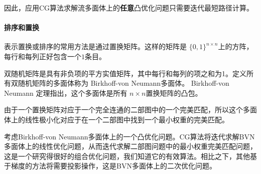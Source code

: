 因此，应用CG算法求解流多面体上的{\bf 任意}凸优化问题只需要迭代最短路径计算。


\paragraph*{
    排序和置换
    }

表示置换或排序的常用方法是通过置换矩阵。这样的矩阵是 $\{0,1\}^{n \times n}$上的方阵，每行和每列正好包含一个$1$条目。

双随机矩阵是具有非负项的平方实值矩阵，其中每行和每列的项之和为1。定义所有双随机矩阵的多面体称为 Birkhoff-von Neumann多面体。
Birkhoff-von Neumann 定理指出，这个多面体是所有  $n\times{n}$置换矩阵的凸包。

由于一个置换矩阵对应于一个完全连通的二部图中的一个完美匹配，所以这个多面体上的线性极小化对应于在一个二部图中找到一个最小权重的完美匹配。

考虑Birkhoff-von Neumann多面体上的一个凸优化问题。CG算法将迭代求解BVN多面体上的线性优化问题，从而迭代求解二部图问题中的最小权重完美匹配问题，这是一个研究得很好的组合优化问题，我们知道它的有效算法。相比之下，其他基于梯度的方法将需要投影操作，这是BVN多面体上的二次优化问题。

